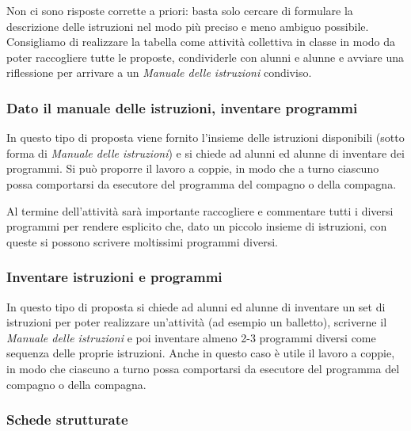 Non ci sono risposte corrette a priori: basta solo cercare di formulare la descrizione delle istruzioni nel modo più preciso e meno ambiguo possibile. Consigliamo di realizzare la tabella come attività collettiva in classe in modo da poter raccogliere tutte le proposte, condividerle con alunni e alunne e avviare una riflessione per arrivare a un \emph{Manuale delle istruzioni} condiviso.


\subsubsection{Dato il manuale delle istruzioni, inventare programmi}

\ruoliattivita{\ruoloProgrammatore}

In questo tipo di proposta viene fornito l'insieme delle istruzioni disponibili (sotto forma di \emph{Manuale delle istruzioni}) e si chiede ad alunni ed alunne di inventare dei programmi. Si può proporre il lavoro a coppie, in modo che a turno ciascuno possa comportarsi da esecutore del programma del compagno o della compagna.

Al termine dell'attività sarà importante raccogliere e commentare tutti i diversi programmi per rendere esplicito che, dato un piccolo insieme di istruzioni, con queste si possono scrivere moltissimi programmi diversi.

\subsubsection{Inventare istruzioni e programmi}
\ruoliattivita{\ruoloProgrammatore}


In questo tipo di proposta si chiede ad alunni ed alunne di inventare un set di istruzioni per poter realizzare un'attività (ad esempio un balletto), scriverne il \emph{Manuale delle istruzioni} e poi inventare almeno 2-3 programmi diversi come sequenza delle proprie istruzioni. Anche in questo caso è utile il lavoro a coppie, in modo che ciascuno a turno possa comportarsi da esecutore del programma del compagno o della compagna.

\subsubsection{Schede strutturate}


